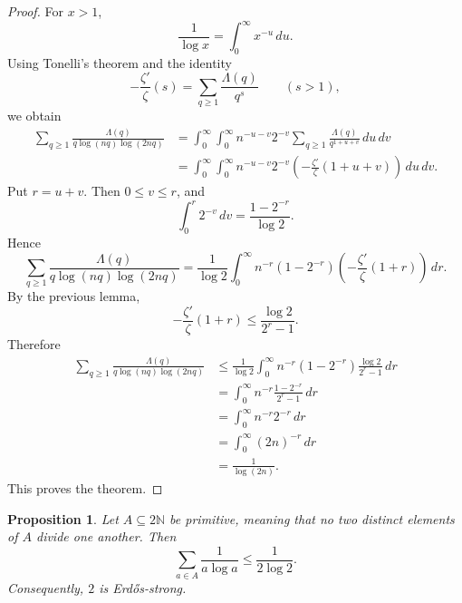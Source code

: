 \documentclass{amsart}
\newtheorem{proposition}{Proposition}
\begin{document}
\begin{proof}
For \(x>1\),
\[
\frac{1}{\log x}
=
\int_0^\infty x^{-u}\,du.
\]
Using Tonelli's theorem and the identity
\[
-\frac{\zeta'}{\zeta}(s)
=
\sum_{q\ge 1}\frac{\Lambda(q)}{q^s}
\qquad (s>1),
\]
we obtain
\[
\begin{aligned}
\sum_{q\ge 1}
\frac{\Lambda(q)}{q\log(nq)\log(2nq)}
&=
\int_0^\infty\int_0^\infty
n^{-u-v}2^{-v}
\sum_{q\ge 1}\frac{\Lambda(q)}{q^{1+u+v}}
\,du\,dv  \\
&=
\int_0^\infty\int_0^\infty
n^{-u-v}2^{-v}
\left(-\frac{\zeta'}{\zeta}(1+u+v)\right)
\,du\,dv .
\end{aligned}
\]
Put \(r=u+v\). Then \(0\le v\le r\), and
\[
\int_0^r 2^{-v}\,dv
=
\frac{1-2^{-r}}{\log 2}.
\]
Hence
\[
\sum_{q\ge 1}
\frac{\Lambda(q)}{q\log(nq)\log(2nq)}
=
\frac{1}{\log 2}
\int_0^\infty
n^{-r}(1-2^{-r})
\left(-\frac{\zeta'}{\zeta}(1+r)\right)
\,dr .
\]
By the previous lemma,
\[
-\frac{\zeta'}{\zeta}(1+r)
\le
\frac{\log 2}{2^r-1}.
\]
Therefore
\[
\begin{aligned}
\sum_{q\ge 1}
\frac{\Lambda(q)}{q\log(nq)\log(2nq)}
&\le
\frac{1}{\log 2}
\int_0^\infty
n^{-r}(1-2^{-r})
\frac{\log 2}{2^r-1}
\,dr  \\
&=
\int_0^\infty
n^{-r}\frac{1-2^{-r}}{2^r-1}
\,dr  \\
&=
\int_0^\infty
n^{-r}2^{-r}\,dr  \\
&=
\int_0^\infty
(2n)^{-r}\,dr  \\
&=
\frac{1}{\log(2n)}.
\end{aligned}
\]
This proves the theorem.
\end{proof}

\begin{proposition}
Let \(A\subseteq 2\mathbb N\) be primitive, meaning that no two distinct
elements of \(A\) divide one another. Then
\[
\sum_{a\in A}\frac{1}{a\log a}
\le
\frac{1}{2\log 2}.
\]
Consequently, \(2\) is Erd\H{o}s-strong.
\end{proposition}
\end{document}
